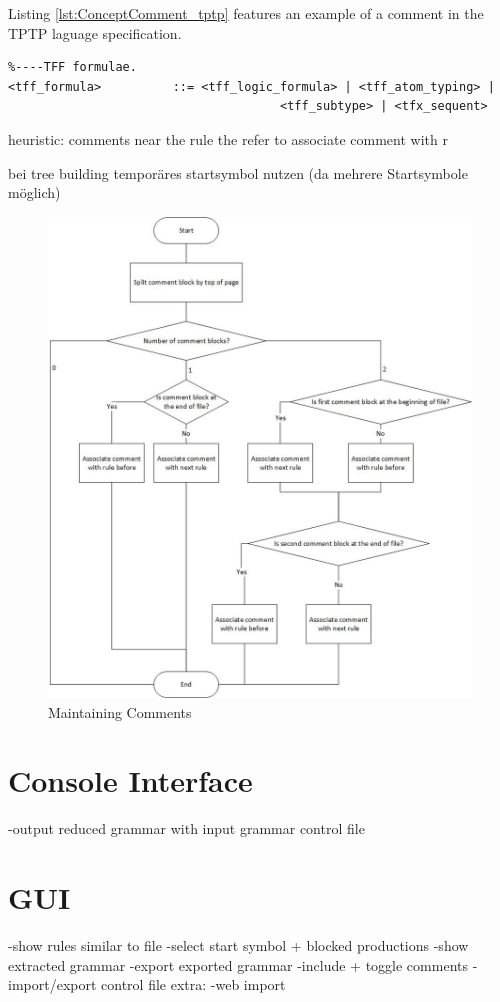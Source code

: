 Listing \ref{lst:ConceptComment_tptp} features an example of a comment in the \ac{TPTP} laguage specification.
\begin{lstlisting}[basicstyle=\scriptsize	,caption= Example of a comment in the \ac{TPTP} language specification,label= lst:ConceptComment_tptp]
%----Top of Page---------------------------------------------------------------
%----TFF formulae.
<tff_formula>          ::= <tff_logic_formula> | <tff_atom_typing> |
                           			  <tff_subtype> | <tfx_sequent>
\end{lstlisting}
heuristic:
comments near the rule the refer to
associate comment with r

bei tree building temporäres startsymbol nutzen (da mehrere Startsymbole möglich)

\begin{figure}[H]
\centering
\includegraphics[width=1\textwidth]{images/maintainingComments.jpg}
\caption{Maintaining Comments}
\label{fig:comments}
\end{figure}

\section{Console Interface}\label{sec:Console Interface}
-output reduced grammar with input grammar control file 
\section{GUI}\label{sec:ConceptGUI}
-show rules similar to file
-select start symbol + blocked productions
-show extracted grammar
-export exported grammar
-include + toggle comments
-import/export control file
extra:
-web import


